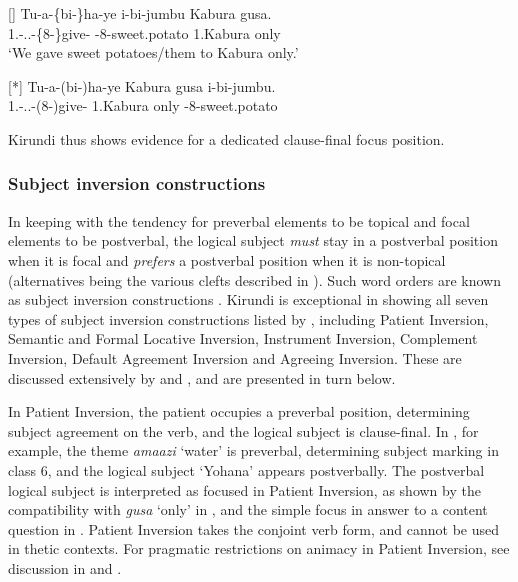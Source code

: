 \documentclass[output=paper]{langscibook}
\begin{document}
\z
\z

\ea
\ea
[]{
\label{bkm:Ref72332359}
\gll
Tu-a-\{bi-\}ha-ye  {i-bi-jumbu}  Kabura  gusa.\\
1\PL.\SM-\N.\PST.\CJ-\{8\OM-\}give-\PFV{}  {\AUG{}-8-sweet.potato}  1.Kabura  only\\
\glt
    ‘We gave sweet potatoes/them to Kabura only.’\\
}

\ex
[*]{
\gll
Tu-a-(bi-)ha-ye  Kabura  gusa  i-bi-jumbu.\\
1\PL.\SM-\N.\PST.\CJ-(8\OM-)give-\PFV{}  1.Kabura  only  \AUG{}-8-sweet.potato\\
\glt
}

\z
\z

Kirundi thus shows evidence for a dedicated clause-final focus position.

\subsubsection{Subject inversion constructions}
\label{bkm:Ref75783474}
In keeping with the tendency for preverbal elements to be topical and focal elements to be postverbal, the logical subject \textit{must} stay in a postverbal position when it is focal and \textit{prefers} a postverbal position when it is non-topical (alternatives being the various clefts described in ). Such word orders are known as subject inversion constructions \citep{Zerbian2006a}. Kirundi is exceptional in showing all seven types of subject inversion constructions listed by \citet{MartenvanderWal2014}, including Patient Inversion, Semantic and Formal Locative Inversion, Instrument Inversion, Complement Inversion, Default Agreement Inversion and Agreeing Inversion. These are discussed extensively by \citet{Nshemezimana2016,Ndayiragije1999,Morimoto2000,Morimoto2006,Morimoto2009} and \citet{Sabimana1986}, and are presented in turn below.

In Patient Inversion, the patient occupies a preverbal position, determining subject agreement on the verb, and the logical subject is clause-final. In , for example, the theme \textit{amaazi} ‘water’ is preverbal, determining subject marking in class 6, and the logical subject ‘Yohana’ appears postverbally. The postverbal logical subject is interpreted as focused in Patient Inversion, as shown by the compatibility with \textit{gusa} ‘only’ in , and the simple focus in answer to a content question in . Patient Inversion takes the conjoint verb form, and cannot be used in thetic contexts. For pragmatic restrictions on animacy in Patient Inversion, see discussion in \citet{Morimoto2006} and \citet{Nshemezimana2016}.
\end{document}
